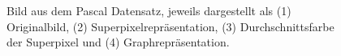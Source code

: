 \begin{figure}[t]
\centering
{}
\caption[\gls{Pascal}]{Bild aus dem \gls{Pascal} Datensatz, jeweils dargestellt als (1) Originalbild, (2) Superpixelrepräsentation, (3) Durchschnittsfarbe der Superpixel und (4) Graphrepräsentation.}
\label{fig:pascal_voc}
\end{figure}
